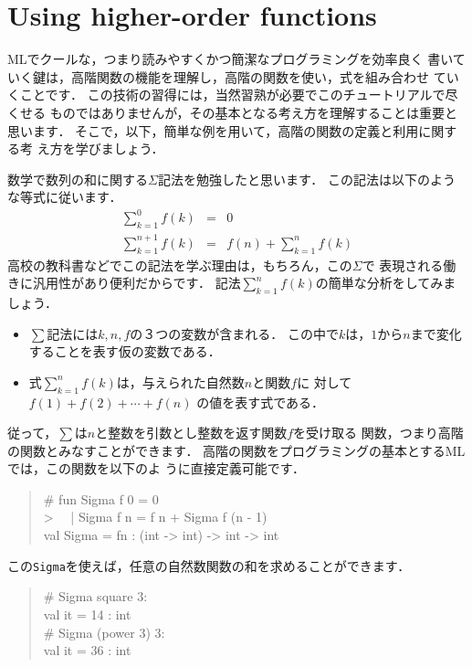 \documentclass{jbook}
\newif\ifjp
\newcommand{\txt}[2]{#2}
\begin{document}
\section{\txt{高階の関数の利用}{Using higher-order functions}}
\label{sec:tutorialHeigher-order-use}


\ifjp%
	MLでクールな，つまり読みやすくかつ簡潔なプログラミングを効率良く
書いていく鍵は，高階関数の機能を理解し，高階の関数を使い，式を組み合わせ
ていくことです．
	この技術の習得には，当然習熟が必要でこのチュートリアルで尽くせる
ものではありませんが，その基本となる考え方を理解することは重要と思います．
	そこで，以下，簡単な例を用いて，高階の関数の定義と利用に関する考
え方を学びましょう．

	数学で数列の和に関する$\Sigma$記法を勉強したと思います．
	この記法は以下のような等式に従います．
\begin{eqnarray*}
\sum_{k=1}^0 f(k) &=& 0\\
\sum_{k=1}^{n+1} f(k) &=& f(n) + \sum_{k=1}^{n} f(k)
\end{eqnarray*}
	高校の教科書などでこの記法を学ぶ理由は，もちろん，この$\Sigma$で
表現される働きに汎用性があり便利だからです．
	記法$\sum_{k=1}^n f(k)$の簡単な分析をしてみましょう．
\begin{itemize}
\item $\sum$記法には$k,n,f$の３つの変数が含まれる．
この中で$k$は，$1$から$n$まで変化することを表す仮の変数である．
\item 式$\sum_{k=1}^n f(k)$は，与えられた自然数$n$と関数$f$に
対して
$
f(1) + f(2) + \cdots + f(n)
$
の値を表す式である．
\end{itemize}
	従って，$\sum$は$n$と整数を引数とし整数を返す関数$f$を受け取る
関数，つまり高階の関数とみなすことができます．
	高階の関数をプログラミングの基本とするMLでは，この関数を以下のよ
うに直接定義可能です．
\begin{tt}
\begin{quote}
\# fun Sigma f 0 = 0\\
> \ \  | Sigma f n = f n + Sigma f (n - 1)\\
val Sigma = fn : (int -> int) -> int -> int
\end{quote}
\end{tt}
この{\tt Sigma}を使えば，任意の自然数関数の和を求めることができます．
\begin{tt}
\begin{quote}
\# Sigma square 3:\\
val it = 14 : int\\
\# Sigma (power 3) 3:\\
val it = 36 : int
\end{quote}
\end{tt}
\end{document}
